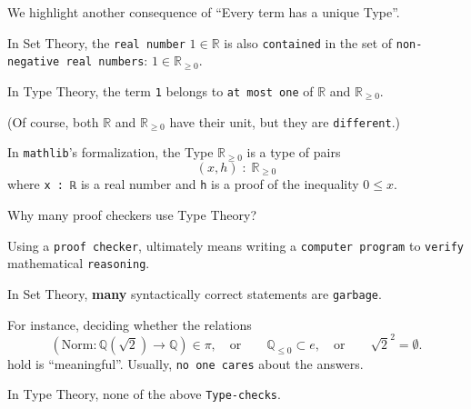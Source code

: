 \documentclass{beamer}
\begin{document}
\begin{frame}[fragile]

We highlight another consequence of ``Every term has a unique Type''.

In Set Theory, the {\color{violet}\verb`real number`} $1 \in \mathbb{R}$ is also {\color{violet}\verb`contained`} in the set of {\color{violet}\verb`non-negative real numbers`}: $1 \in \mathbb{R}_{\ge 0}$.

In Type Theory, the term {\color{violet}\verb`1`} belongs to {\color{violet}\verb`at most one`} of $\mathbb{R}$ and $\mathbb{R}_{\ge 0}$.

(Of course, both $\mathbb{R}$ and $\mathbb{R}_{\ge 0}$ have their unit, but they are {\color{violet}\verb`different`}.)

In {\color{violet}\verb`mathlib`}'s formalization, the Type $\mathbb{R}_{\ge 0}$ is a type of pairs
$$
  (x, h) \; : \; \mathbb{R}_{\ge 0}
$$
where {\color{violet}\verb`x : ℝ`} is a real number and {\color{violet}\verb`h`} is a proof of the inequality $0 \le x$.
\end{frame}

\begin{frame}[fragile]{Why many proof checkers use Type Theory?}

Using a {\color{violet}\verb`proof checker`}, ultimately means writing a {\color{violet}\verb`computer program`} to {\color{violet}\verb`verify`} mathematical {\color{violet}\verb`reasoning`}.

In Set Theory, {\textbf{many}} syntactically correct statements are {\color{violet}\verb`garbage`}.

For instance, deciding whether the relations
$$
  \left(
    {\textrm{Norm}} \colon \mathbb{Q}\left( \sqrt{2} \right) \to \mathbb{Q}
  \right) \in \pi,
  \quad {\textrm{or}} \qquad
  \mathbb{Q}_{\le 0} \subset e,
  \quad {\textrm{or}} \qquad
  \sqrt{2} ^ 2 = \emptyset.
$$
hold is ``meaningful''.
Usually, {\color{violet}\verb`no one cares`} about the answers.

In Type Theory, none of the above {\color{violet}\verb`Type-checks`}.
\end{frame}
\end{document}

